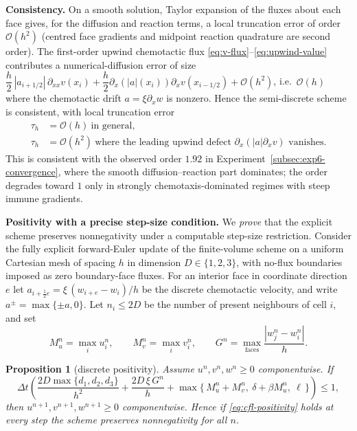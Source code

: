 \documentclass[a4paper,fleqn,longmktitle]{cas-sc}
\theoremstyle{plain}
\newtheorem{proposition}[theorem]{Proposition}
\theoremstyle{definition}
\numberwithin{equation}{section}
\begin{document}
\medskip\noindent\textbf{Consistency.}
On a smooth solution, Taylor expansion of the fluxes about each face gives, for
the diffusion and reaction terms, a local truncation error of order
$\mathcal O(h^2)$ (centred face gradients and midpoint reaction quadrature are
second order). The first-order upwind chemotactic flux
\eqref{eq:v-flux}--\eqref{eq:upwind-value} contributes a numerical-diffusion
error of size
$\dfrac h2\,|a_{i+1/2}|\,\partial_{xx}v(x_i)+\dfrac{h}{2}\partial_x(|a|(x_i))\partial_xv(x_{i-1/2})+\mathcal O(h^2)$, i.e.\
$\mathcal O(h)$ where the chemotactic drift $a=\xi\partial_x w$ is nonzero. Hence
the semi-discrete scheme is consistent, with local truncation error
\[
\begin{aligned}
\tau_h&=\mathcal O(h)\ \text{in general},\\[3pt]
\tau_h&=\mathcal O(h^2)\ \text{where the leading upwind defect $\partial_x(\lvert a\rvert \partial_xv)$ vanishes.}
\end{aligned}
\]
This is consistent with the observed order $1.92$ in
Experiment~\ref{subsec:exp6-convergence}, where the smooth diffusion--reaction
part dominates; the order degrades toward $1$ only in strongly
chemotaxis-dominated regimes with steep immune gradients.

\medskip\noindent\textbf{Positivity with a precise step-size condition.}
We \emph{prove} that the explicit scheme preserves nonnegativity under a
computable step-size restriction. Consider the fully explicit forward-Euler
update of the finite-volume scheme on a uniform Cartesian mesh of spacing $h$ in
dimension $D\in\{1,2,3\}$, with no-flux boundaries imposed as zero boundary-face
fluxes. For an interior face in coordinate direction $e$ let
$a_{i+\frac12 e}=\xi\,(w_{i+e}-w_i)/h$ be the discrete chemotactic velocity, and
write $a^{\pm}=\max\{\pm a,0\}$. Let $n_i\le 2D$ be the number of present
neighbours of cell $i$, and set
\[
M_u^n=\max_i u_i^n,\qquad M_v^n=\max_i v_i^n,\qquad
G^n=\max_{\text{faces}}\frac{|w^n_{j}-w^n_i|}{h}.
\]

\begin{proposition}[discrete positivity]\label{prop:positivity-cfl}
Assume $u^n,v^n,w^n\ge0$ componentwise. If
\begin{equation}\label{eq:cfl-positivity}
\Delta t\left(\frac{2D\max\{d_1,d_2,d_3\}}{h^2}
+\frac{2D\,\xi\,G^n}{h}
+\max\{\,M_u^n+M_v^n,\ \delta+\beta M_u^n,\ \ell\,\}\right)\le 1,
\end{equation}
then $u^{n+1},v^{n+1},w^{n+1}\ge0$ componentwise. Hence if
\eqref{eq:cfl-positivity} holds at every step the scheme preserves nonnegativity
for all $n$.    
\end{proposition}
\end{document}
